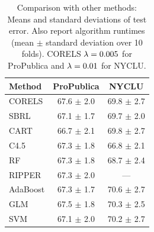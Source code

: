 \begin{arxiv}
\begin{table}[t]
\centering
\begin{tabular}{l | c | c}
Method & ProPublica & NYCLU \\
\hline
CORELS & 67.6 $\pm$ 2.0 & 69.8 $\pm$ 2.7 \\
SBRL & 67.1 $\pm$ 1.7 & 69.7 $\pm$ 2.0 \\
CART & 66.7 $\pm$ 2.1 & 69.8 $\pm$ 2.7 \\
C4.5 & 67.3 $\pm$ 1.8 & 66.8 $\pm$ 2.1 \\
RF & 67.3 $\pm$ 1.8 & 68.7 $\pm$ 2.4 \\
RIPPER & 67.3 $\pm$ 2.0 & --- \\
AdaBoost & 67.3 $\pm$ 1.7 & 70.6 $\pm$ 2.7 \\
GLM & 67.5 $\pm$ 1.8 & 70.3 $\pm$ 2.5 \\
SVM & 67.1 $\pm$ 2.0 & 70.2 $\pm$ 2.7 \\
\end{tabular}
\vspace{5mm}
\caption{Comparison with other methods:
Means and standard deviations of test error.
Also report algorithm runtimes (mean $\pm$ standard deviation over 10 folds).
CORELS ${{\lambda} = 0.005}$ for ProPublica and ${{\lambda} = 0.01}$ for NYCLU.}
\label{tab:comparison}
\end{table}
\end{arxiv}

